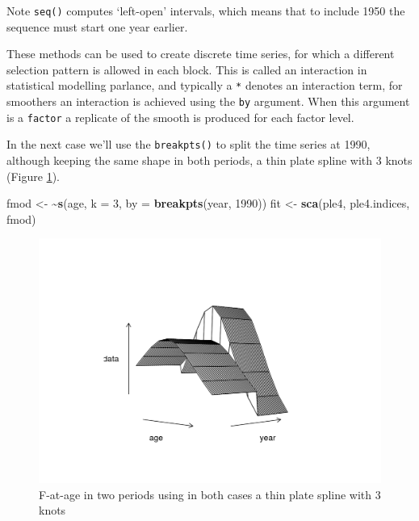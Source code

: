 \documentclass[
]{book}
\newenvironment{Shaded}{\begin{snugshade}}{\end{snugshade}}
\newcommand{\AttributeTok}[1]{\textcolor[rgb]{0.13,0.29,0.53}{#1}}
\newcommand{\DecValTok}[1]{\textcolor[rgb]{0.00,0.00,0.81}{#1}}
\newcommand{\ErrorTok}[1]{\textcolor[rgb]{0.64,0.00,0.00}{\textbf{#1}}}
\newcommand{\FunctionTok}[1]{\textcolor[rgb]{0.13,0.29,0.53}{\textbf{#1}}}
\newcommand{\NormalTok}[1]{#1}
\newcommand{\OtherTok}[1]{\textcolor[rgb]{0.56,0.35,0.01}{#1}}
\begin{document}
Note \texttt{seq()} computes `left-open' intervals, which means that to include 1950 the sequence must start one year earlier.

These methods can be used to create discrete time series, for which a different selection pattern is allowed in each block. This is called an interaction in statistical modelling parlance, and typically a \texttt{*} denotes an interaction term, for smoothers an interaction is achieved using the \texttt{by} argument. When this argument is a \texttt{factor} a replicate of the smooth is produced for each factor level.

In the next case we'll use the \texttt{breakpts()} to split the time series at 1990, although keeping the same shape in both periods, a thin plate spline with 3 knots (Figure \ref{fig:brk}).

\begin{Shaded}
\begin{Highlighting}[]
\NormalTok{fmod }\OtherTok{\textless{}{-}} \ErrorTok{\textasciitilde{}}\FunctionTok{s}\NormalTok{(age, }\AttributeTok{k =} \DecValTok{3}\NormalTok{, }\AttributeTok{by =} \FunctionTok{breakpts}\NormalTok{(year, }\DecValTok{1990}\NormalTok{))}
\NormalTok{fit }\OtherTok{\textless{}{-}} \FunctionTok{sca}\NormalTok{(ple4, ple4.indices, fmod)}
\end{Highlighting}
\end{Shaded}

\begin{figure}
\centering
\includegraphics{_bookdown_files/_main_files/figure-html/brk-1.png}
\caption{\label{fig:brk}F-at-age in two periods using in both cases a thin plate spline with 3 knots}
\end{figure}
\end{document}
